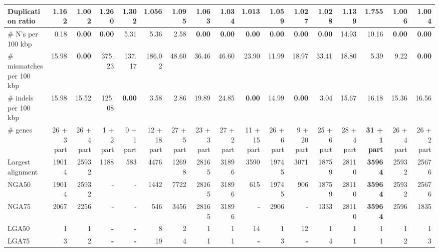 \documentclass[12pt,a4paper]{article}
\begin{document}
\begin{table}[ht]
\begin{center}
\begin{tabular}{|l*{16}{|r}|}
Duplication ratio & 1.162 & {\bf 1.002} & 1.260 & 1.302 & 1.056 & 1.095 & 1.063 & 1.034 & 1.013 & 1.059 & 1.027 & 1.028 & 1.139 & 1.755 & 1.006 & 1.004 \\ \hline
\# N's per 100 kbp & 0.18 & {\bf 0.00} & {\bf 0.00} & 5.31 & 5.36 & 2.58 & {\bf 0.00} & {\bf 0.00} & {\bf 0.00} & {\bf 0.00} & {\bf 0.00} & {\bf 0.00} & 14.93 & 10.16 & {\bf 0.00} & {\bf 0.00} \\ \hline
\# mismatches per 100 kbp & 15.98 & {\bf 0.00} & 375.23 & 137.17 & 186.02 & 48.60 & 36.46 & 46.60 & 23.90 & 11.99 & 18.97 & 33.41 & 18.80 & 5.39 & 9.22 & {\bf 0.00} \\ \hline
\# indels per 100 kbp & 15.98 & 15.52 & 125.08 & {\bf 0.00} & 3.58 & 2.86 & 19.89 & 24.85 & {\bf 0.00} & 14.99 & {\bf 0.00} & 3.04 & 15.67 & 16.18 & 15.36 & 16.56 \\ \hline
\# genes & 26 + 3 part & 26 + 4 part & 1 + 2 part & 0 + 1 part & 12 + 18 part & 27 + 5 part & 23 + 3 part & 27 + 2 part & 11 + 15 part & 26 + 6 part & 9 + 20 part & 25 + 6 part & 28 + 4 part & {\bf 31 + 1 part} & 26 + 4 part & 26 + 2 part \\ \hline
Largest alignment & 19014 & 25932 & 1188 & 583 & 4476 & 12698 & 28165 & 31896 & 3590 & 19745 & 3071 & 18759 & 28110 & {\bf 35964} & 25932 & 25676 \\ \hline
NGA50 & 19014 & 25932 & - & - & 1442 & 7722 & 28165 & 31896 & 615 & 19745 & 906 & 18759 & 28110 & {\bf 35964} & 25932 & 25676 \\ \hline
NGA75 & 2067 & 2256 & - & - & 546 & 3456 & 28165 & 31896 & - & 2906 & - & 1333 & 28110 & {\bf 35964} & 2596 & 1835 \\ \hline
LGA50 & 1 & 1 & {\bf -} & {\bf -} & 8 & 2 & 1 & 1 & 14 & 1 & 12 & 1 & 1 & 1 & 1 & 1 \\ \hline
LGA75 & 3 & 2 & {\bf -} & {\bf -} & 19 & 4 & 1 & 1 & {\bf -} & 3 & {\bf -} & 4 & 1 & 1 & 2 & 3 \\ \hline
\end{tabular}
\end{center}
\end{table}
\end{document}
